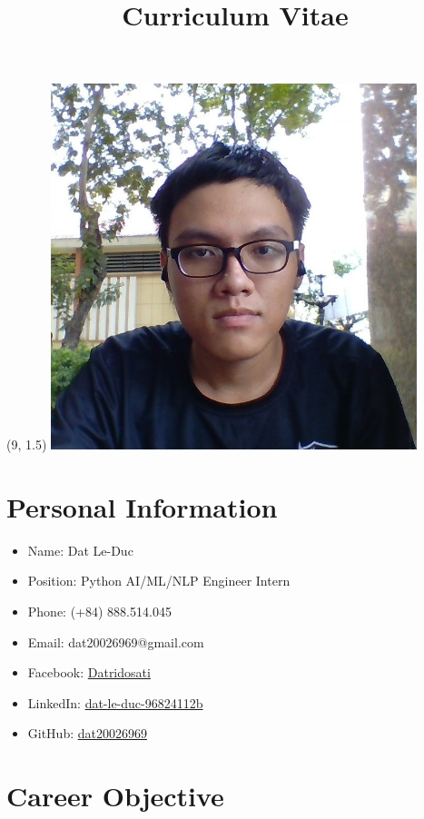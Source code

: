 \documentclass[a4paper,10pt]{article}
\title{\vspace{-4cm}Curriculum Vitae}
\date{}
\begin{document}
\maketitle

\begin{textblock}{6}(9, 1.5)
    \includegraphics[width=0.8\textwidth]{a.jpg}
\end{textblock}

\section*{Personal Information}

\begin{itemize}
    \item Name: Dat Le-Duc
    \item Position: Python AI/ML/NLP Engineer Intern
    \item Phone: (+84) 888.514.045
    \item Email: dat20026969@gmail.com
    \item Facebook: \href{https://www.facebook.com/Datridosati}{Datridosati}
    \item LinkedIn: \href{https://www.linkedin.com/in/dat-le-duc-96824112b}{dat-le-duc-96824112b}
    \item GitHub: \href{https://github.com/dat20026969}{dat20026969}
\end{itemize}

\section*{Career Objective}
\end{document}
